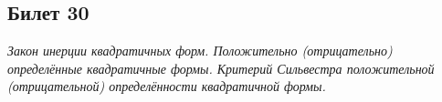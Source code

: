 \subsection{Билет 30}

\textit{Закон инерции квадратичных форм. Положительно (отрицательно) определённые квадратичные формы. Критерий Сильвестра положительной (отрицательной) определённости квадратичной формы.}\\









